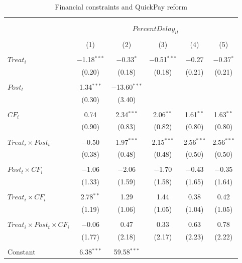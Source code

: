 \documentclass[
]{article}
\begin{document}
\begin{table}[H] \centering 
  \caption{Financial constraints and QuickPay reform} 
  \label{} 
\small 
\begin{tabular}{@{\extracolsep{-2pt}}lccccc} 
\\[-1.8ex]\hline 
\hline \\[-1.8ex] 
\\[-1.8ex] & \multicolumn{5}{c}{$PercentDelay_{it}$  } \\ 
\\[-1.8ex] & (1) & (2) & (3) & (4) & (5)\\ 
\hline \\[-1.8ex] 
 $Treat_i$ & $-$1.18$^{***}$ & $-$0.33$^{*}$ & $-$0.51$^{***}$ & $-$0.27 & $-$0.37$^{*}$ \\ 
  & (0.20) & (0.18) & (0.18) & (0.21) & (0.21) \\ 
  & & & & & \\ 
 $Post_t$ & 1.34$^{***}$ & $-$13.60$^{***}$ &  &  &  \\ 
  & (0.30) & (3.40) &  &  &  \\ 
  & & & & & \\ 
 $CF_i$ & 0.74 & 2.34$^{***}$ & 2.06$^{**}$ & 1.61$^{**}$ & 1.63$^{**}$ \\ 
  & (0.90) & (0.83) & (0.82) & (0.80) & (0.80) \\ 
  & & & & & \\ 
 $Treat_i \times Post_t$ & $-$0.50 & 1.97$^{***}$ & 2.15$^{***}$ & 2.56$^{***}$ & 2.56$^{***}$ \\ 
  & (0.38) & (0.48) & (0.48) & (0.50) & (0.50) \\ 
  & & & & & \\ 
 $Post_t \times CF_i$ & $-$1.06 & $-$2.06 & $-$1.70 & $-$0.43 & $-$0.35 \\ 
  & (1.33) & (1.59) & (1.58) & (1.65) & (1.64) \\ 
  & & & & & \\ 
 $Treat_i \times CF_i$ & 2.78$^{**}$ & 1.29 & 1.44 & 0.38 & 0.42 \\ 
  & (1.19) & (1.06) & (1.05) & (1.04) & (1.05) \\ 
  & & & & & \\ 
 $Treat_i \times Post_t \times CF_i$ & $-$0.06 & 0.47 & 0.33 & 0.63 & 0.78 \\ 
  & (1.77) & (2.18) & (2.17) & (2.23) & (2.22) \\ 
  & & & & & \\ 
 Constant & 6.38$^{***}$ & 59.58$^{***}$ &  &  &  \\ 

\end{tabular}
\end{table}
\end{document}
